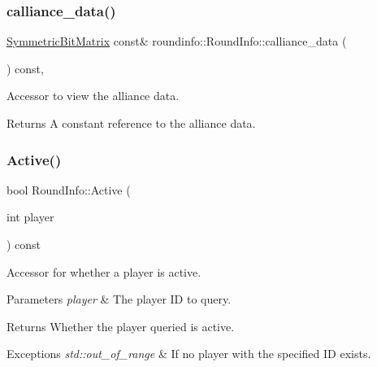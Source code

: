 \subsubsection{\texorpdfstring{calliance\+\_\+data()}{calliance\_data()}}
{\footnotesize\ttfamily \hyperlink{class_symmetric_bit_matrix}{Symmetric\+Bit\+Matrix} const\& roundinfo\+::\+Round\+Info\+::calliance\+\_\+data (\begin{DoxyParamCaption}{ }\end{DoxyParamCaption}) const\hspace{0.3cm}{\ttfamily [inline]}, {\ttfamily [noexcept]}}



Accessor to view the alliance data. 

\begin{DoxyReturn}{Returns}
A constant reference to the alliance data. 
\end{DoxyReturn}
\mbox{\label{classroundinfo_1_1_round_info_a03a7ee40677506160aef2766929e6105}} 
\subsubsection{\texorpdfstring{Active()}{Active()}}
{\footnotesize\ttfamily bool Round\+Info\+::\+Active (\begin{DoxyParamCaption}\item[{int}]{player }\end{DoxyParamCaption}) const}



Accessor for whether a player is active. 


\begin{DoxyParams}{Parameters}
{\em player} & The player ID to query. \\
\hline
\end{DoxyParams}
\begin{DoxyReturn}{Returns}
Whether the player queried is active. 
\end{DoxyReturn}

\begin{DoxyExceptions}{Exceptions}
{\em std\+::out\+\_\+of\+\_\+range} & If no player with the specified ID exists. \\
\hline
\end{DoxyExceptions}
\mbox{\label{classroundinfo_1_1_round_info_ab9e17ca5d68f9981862cbf540cc0b297}} 

